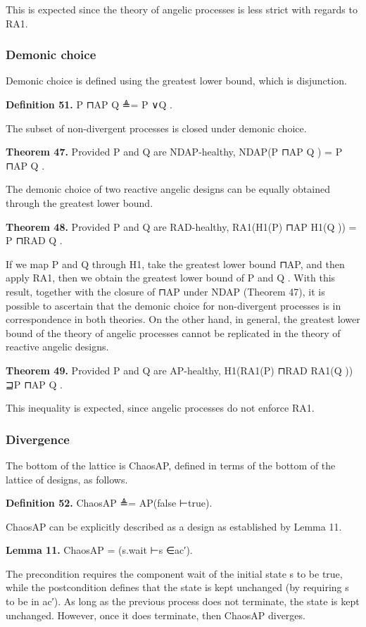 \documentclass[11pt]{article}
\begin{document}
This is expected since the theory of angelic processes is less strict with regards to RA1.

\subsubsection{Demonic choice}
Demonic choice is defined using the greatest lower bound, which is disjunction.

\noindent\textbf{Definition 51.} P ⊓AP Q ≜= P ∨Q .


The subset of non-divergent processes is closed under demonic choice.

\noindent\textbf{Theorem 47.} Provided P and Q are NDAP-healthy, NDAP(P ⊓AP Q ) = P ⊓AP Q .


The demonic choice of two reactive angelic designs can be equally obtained through the greatest lower bound.

\noindent\textbf{Theorem 48.} Provided P and Q are RAD-healthy, RA1(H1(P) ⊓AP H1(Q )) = P ⊓RAD Q .


If we map P and Q through H1, take the greatest lower bound ⊓AP, and then apply RA1, then we obtain the greatest lower bound of P and Q . With this result, together with the closure of ⊓AP under NDAP (Theorem 47), it is possible to ascertain that the demonic choice for non-divergent processes is in correspondence in both theories. On the other hand, in general, the greatest lower bound of the theory of angelic processes cannot be replicated in the theory of reactive angelic designs.

\noindent\textbf{Theorem 49.} Provided P and Q are AP-healthy, H1(RA1(P) ⊓RAD RA1(Q )) ⊒P ⊓AP Q .


This inequality is expected, since angelic processes do not enforce RA1.

\subsubsection{Divergence}
The bottom of the lattice is ChaosAP, defined in terms of the bottom of the lattice of designs, as follows.

\noindent\textbf{Definition 52.} ChaosAP ≜= AP(false ⊢true).


ChaosAP can be explicitly described as a design as established by Lemma 11.

\noindent\textbf{Lemma 11.} ChaosAP = (s.wait ⊢s ∈ac′).


The precondition requires the component wait of the initial state s to be true, while the postcondition defines that the state is kept unchanged (by requiring s to be in ac′). As long as the previous process does not terminate, the state is kept unchanged. However, once it does terminate, then ChaosAP diverges.
\end{document}
